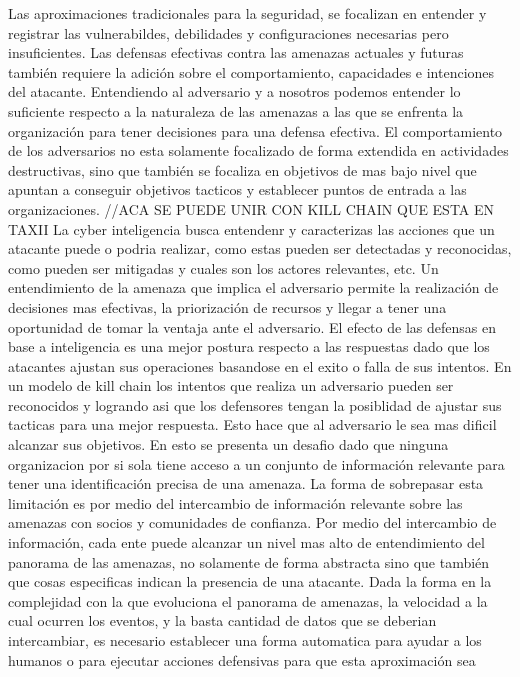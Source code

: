 Las aproximaciones tradicionales para la seguridad, se focalizan en entender y 
registrar las vulnerabildes, debilidades y configuraciones necesarias pero 
insuficientes. Las defensas efectivas contra las amenazas actuales y futuras 
también requiere la adición sobre el comportamiento, capacidades e intenciones 
del atacante. Entendiendo al adversario y a nosotros podemos entender lo 
suficiente respecto a la naturaleza de las amenazas a las que se enfrenta la 
organización para tener decisiones para una defensa efectiva. El comportamiento 
de los adversarios no esta solamente focalizado de forma extendida en 
actividades destructivas, sino que también se focaliza en  objetivos de mas bajo 
nivel que apuntan a conseguir objetivos tacticos y establecer puntos de entrada 
a las organizaciones. 
//ACA SE PUEDE UNIR CON KILL CHAIN QUE ESTA EN TAXII
La cyber inteligencia busca entendenr y caracterizas las acciones que un 
atacante puede o podria realizar, como estas pueden ser detectadas y 
reconocidas, como pueden ser mitigadas y cuales son los actores relevantes, etc.
Un entendimiento de la amenaza que implica el adversario permite la realización 
de decisiones mas efectivas, la priorización de recursos y llegar a tener una 
oportunidad de tomar la ventaja ante el adversario. El efecto de las defensas en 
base a inteligencia es una mejor postura respecto a las respuestas dado que los 
atacantes ajustan sus operaciones basandose en el exito o falla de sus intentos. 
En un modelo de kill chain los intentos que realiza un adversario pueden ser 
reconocidos y logrando asi que los defensores tengan la posiblidad de ajustar 
sus tacticas para una mejor respuesta. Esto hace que al adversario le sea mas 
dificil alcanzar sus objetivos.
En esto se presenta un desafio dado que ninguna organizacion por si sola tiene 
acceso a un conjunto de información relevante para tener una identificación 
precisa de una amenaza. La forma de sobrepasar esta limitación es por medio del 
intercambio de información relevante sobre las amenazas con socios y comunidades 
de confianza. Por medio del intercambio de información, cada ente puede alcanzar 
un nivel mas alto de entendimiento del panorama de las amenazas, no solamente de 
forma abstracta sino que también que cosas especificas indican la presencia de 
una atacante.
Dada la forma en la complejidad con la que evoluciona el panorama de amenazas, 
la velocidad a la cual ocurren los eventos, y la basta cantidad de datos que se 
deberian intercambiar, es necesario establecer una forma automatica para ayudar 
a los humanos o para ejecutar acciones defensivas para que esta aproximación sea 
